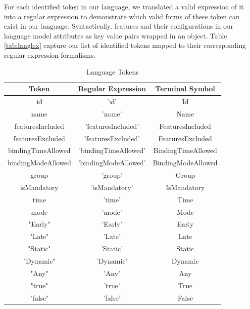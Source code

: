 \documentclass[conference]{IEEEtran}
\begin{document}
For each identified token in our language, we translated a valid expression of it into a regular expression to demonstrate which valid forms of these token can exist in our language. Syntactically, features and their configurations in our language model attributes as key value pairs wrapped in an object. Table \ref{tab:langlex} capture our list of identified tokens mapped to their corresponding regular expression formalisms.

\begin{table}[H]
\caption{Language Tokens}
\begin{center}
\begin{tabular}{|c|c|c|}
\hline
    Token & Regular Expression & Terminal Symbol \\\hline
                             id & 'id' & Id  \\\hline
                             name & 'name' & Name \\ \hline
                             featuresIncluded & 'featuresIncluded' & FeaturesIncluded\\ \hline
                             featuresExcluded & 'featuresExcluded' & FeaturesExcluded\\ \hline
                             bindingTimeAllowed & 'bindingTimeAllowed' & BindingTimeAllowed\\ \hline
                             bindingModeAllowed & 'bindingModeAllowed' & BindingModeAllowed\\\hline
                             group & 'group' & Group\\ \hline
                             isMandatory & 'isMandatory' & IsMandatory\\ \hline
                             time & 'time' & Time\\ \hline
                             mode & 'mode' & Mode\\ \hline
                              "Early" & 'Early' & Early\\ \hline
                              "Late" & 'Late' & Late\\ \hline
                              "Static" & 'Static' & Static\\ \hline
                              "Dynamic" & 'Dynamic' & Dynamic\\ \hline
                              "Any" & 'Any' & Any\\ \hline
                              "true" & 'true' & True\\ \hline
                              "false" & 'false' & False\\ \hline

\end{tabular}
\end{center}
\end{table}
\end{document}
